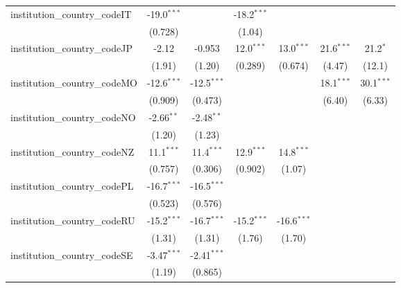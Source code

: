 \begin{tabular}{lcccccc}
   institution\_country\_codeIT          & -19.0$^{***}$ &               & -18.2$^{***}$ &               &               &   \\   
                                         & (0.728)       &               & (1.04)        &               &               &   \\   
   institution\_country\_codeJP          & -2.12         & -0.953        & 12.0$^{***}$  & 13.0$^{***}$  & 21.6$^{***}$  & 21.2$^{*}$\\   
                                         & (1.91)        & (1.20)        & (0.289)       & (0.674)       & (4.47)        & (12.1)\\   
   institution\_country\_codeMO          & -12.6$^{***}$ & -12.5$^{***}$ &               &               & 18.1$^{***}$  & 30.1$^{***}$\\   
                                         & (0.909)       & (0.473)       &               &               & (6.40)        & (6.33)\\   
   institution\_country\_codeNO          & -2.66$^{**}$  & -2.48$^{**}$  &               &               &               &   \\   
                                         & (1.20)        & (1.23)        &               &               &               &   \\   
   institution\_country\_codeNZ          & 11.1$^{***}$  & 11.4$^{***}$  & 12.9$^{***}$  & 14.8$^{***}$  &               &   \\   
                                         & (0.757)       & (0.306)       & (0.902)       & (1.07)        &               &   \\   
   institution\_country\_codePL          & -16.7$^{***}$ & -16.5$^{***}$ &               &               &               &   \\   
                                         & (0.523)       & (0.576)       &               &               &               &   \\   
   institution\_country\_codeRU          & -15.2$^{***}$ & -16.7$^{***}$ & -15.2$^{***}$ & -16.6$^{***}$ &               &   \\   
                                         & (1.31)        & (1.31)        & (1.76)        & (1.70)        &               &   \\   
   institution\_country\_codeSE          & -3.47$^{***}$ & -2.41$^{***}$ &               &               &               &   \\   
                                         & (1.19)        & (0.865)       &               &               &               &   \\   

\end{tabular}

